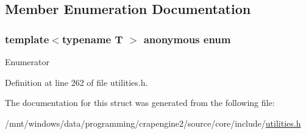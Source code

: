\subsection{Member Enumeration Documentation}
\hypertarget{structcrap_1_1align__of_abb8a0e6a99bb6e29dffcf0148ba95521}{\subsubsection[{anonymous enum}]{\setlength{\rightskip}{0pt plus 5cm}template$<$typename T $>$ anonymous enum}}\label{structcrap_1_1align__of_abb8a0e6a99bb6e29dffcf0148ba95521}
\begin{Desc}
\item[Enumerator]\par
\begin{description}
\item[{\em 
\hypertarget{structcrap_1_1align__of_abb8a0e6a99bb6e29dffcf0148ba95521a8b5c1072cbffe59ec024940bd1bcbe2b}{size}\label{structcrap_1_1align__of_abb8a0e6a99bb6e29dffcf0148ba95521a8b5c1072cbffe59ec024940bd1bcbe2b}
}]\item[{\em 
\hypertarget{structcrap_1_1align__of_abb8a0e6a99bb6e29dffcf0148ba95521a681bb33919188c1863cff58c23b72e69}{value}\label{structcrap_1_1align__of_abb8a0e6a99bb6e29dffcf0148ba95521a681bb33919188c1863cff58c23b72e69}
}]\end{description}
\end{Desc}


Definition at line 262 of file utilities.\+h.



The documentation for this struct was generated from the following file\+:\begin{DoxyCompactItemize}
\item 
/mnt/windows/data/programming/crapengine2/source/core/include/\hyperlink{utilities_8h}{utilities.\+h}\end{DoxyCompactItemize}
